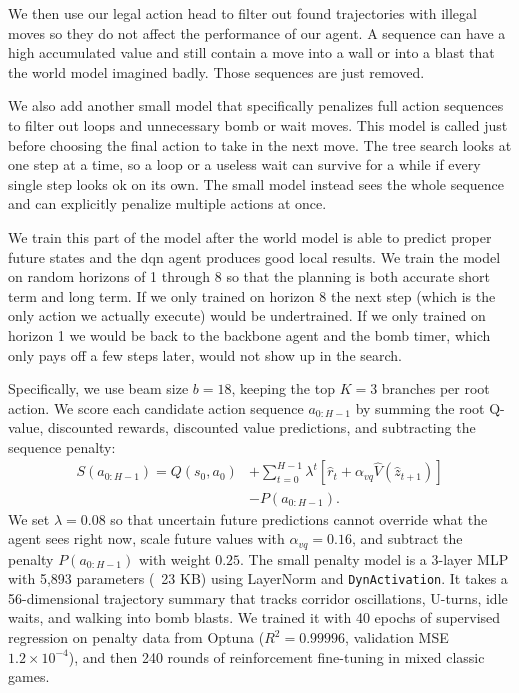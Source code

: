 We then use our legal action head to filter out found trajectories with illegal moves so they do not affect the performance of our agent. A sequence can have a high accumulated value and still contain a move into a wall or into a blast that the world model imagined badly. Those sequences are just removed.

We also add another small model that specifically penalizes full action sequences to filter out loops and unnecessary bomb or wait moves. This model is called just before choosing the final action to take in the next move. The tree search looks at one step at a time, so a loop or a useless wait can survive for a while if every single step looks ok on its own. The small model instead sees the whole sequence and can explicitly penalize multiple actions at once. 

We train this part of the model after the world model is able to predict proper future states and the dqn agent produces good local results. We train the model on random horizons of 1 through 8 so that the planning is both accurate short term and long term. If we only trained on horizon 8 the next step (which is the only action we actually execute) would be undertrained. If we only trained on horizon 1 we would be back to the backbone agent and the bomb timer, which only pays off a few steps later, would not show up in the search.

Specifically, we use beam size $b=18$, keeping the top $K=3$ branches per root action. We score each candidate action sequence $a_{0:H-1}$ by summing the root Q-value, discounted rewards, discounted value predictions, and subtracting the sequence penalty:
\begin{equation}
\begin{aligned}
S(a_{0:H-1}) = Q(s_0, a_0) &+ \sum_{t=0}^{H-1} \lambda^t \left[\hat{r}_t + \alpha_{vq} \hat{V}(\hat{z}_{t+1})\right] \\
&- P(a_{0:H-1}).
\end{aligned}
\end{equation}
We set $\lambda = 0.08$ so that uncertain future predictions cannot override what the agent sees right now, scale future values with $\alpha_{vq} = 0.16$, and subtract the penalty $P(a_{0:H-1})$ with weight $0.25$. The small penalty model is a 3-layer MLP with 5,893 parameters (~23 KB) using LayerNorm and \texttt{DynActivation}. It takes a 56-dimensional trajectory summary that tracks corridor oscillations, U-turns, idle waits, and walking into bomb blasts. We trained it with 40 epochs of supervised regression on penalty data from Optuna ($R^2 = 0.99996$, validation MSE $1.2 \times 10^{-4}$), and then 240 rounds of reinforcement fine-tuning in mixed classic games.

